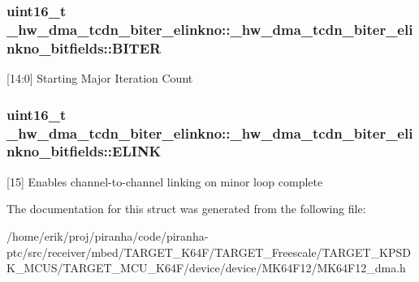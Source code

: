 \subsubsection[{\texorpdfstring{B\+I\+T\+ER}{BITER}}]{\setlength{\rightskip}{0pt plus 5cm}uint16\+\_\+t \+\_\+hw\+\_\+dma\+\_\+tcdn\+\_\+biter\+\_\+elinkno\+::\+\_\+hw\+\_\+dma\+\_\+tcdn\+\_\+biter\+\_\+elinkno\+\_\+bitfields\+::\+B\+I\+T\+ER}\hypertarget{struct__hw__dma__tcdn__biter__elinkno_1_1__hw__dma__tcdn__biter__elinkno__bitfields_a97443cd87bea3be78fb7225bc7d7845e}{}\label{struct__hw__dma__tcdn__biter__elinkno_1_1__hw__dma__tcdn__biter__elinkno__bitfields_a97443cd87bea3be78fb7225bc7d7845e}
\mbox{[}14\+:0\mbox{]} Starting Major Iteration Count 
\subsubsection[{\texorpdfstring{E\+L\+I\+NK}{ELINK}}]{\setlength{\rightskip}{0pt plus 5cm}uint16\+\_\+t \+\_\+hw\+\_\+dma\+\_\+tcdn\+\_\+biter\+\_\+elinkno\+::\+\_\+hw\+\_\+dma\+\_\+tcdn\+\_\+biter\+\_\+elinkno\+\_\+bitfields\+::\+E\+L\+I\+NK}\hypertarget{struct__hw__dma__tcdn__biter__elinkno_1_1__hw__dma__tcdn__biter__elinkno__bitfields_ac6c2527b25e1600b43d4bd58f9227a7c}{}\label{struct__hw__dma__tcdn__biter__elinkno_1_1__hw__dma__tcdn__biter__elinkno__bitfields_ac6c2527b25e1600b43d4bd58f9227a7c}
\mbox{[}15\mbox{]} Enables channel-\/to-\/channel linking on minor loop complete 

The documentation for this struct was generated from the following file\+:\begin{DoxyCompactItemize}
\item 
/home/erik/proj/piranha/code/piranha-\/ptc/src/receiver/mbed/\+T\+A\+R\+G\+E\+T\+\_\+\+K64\+F/\+T\+A\+R\+G\+E\+T\+\_\+\+Freescale/\+T\+A\+R\+G\+E\+T\+\_\+\+K\+P\+S\+D\+K\+\_\+\+M\+C\+U\+S/\+T\+A\+R\+G\+E\+T\+\_\+\+M\+C\+U\+\_\+\+K64\+F/device/device/\+M\+K64\+F12/M\+K64\+F12\+\_\+dma.\+h\end{DoxyCompactItemize}
